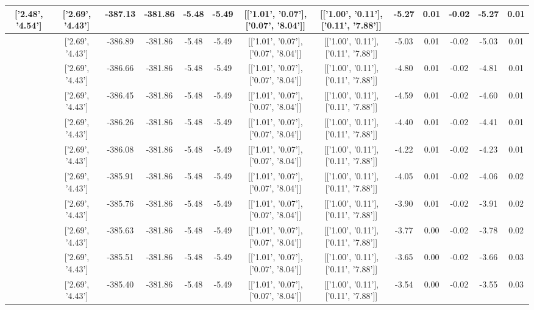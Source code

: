 \begin{table}[htbp]
\begin{adjustbox}{angle=90}
\begin{tabular}{|c|c|c|c|c|c|c|c|c|c|c|c|c|}
 ['2.48', '4.54'] & ['2.69', '4.43'] & -387.13 & -381.86 & -5.48 & -5.49 & [['1.01', '0.07'], ['0.07', '8.04']] & [['1.00', '0.11'], ['0.11', '7.88']] & -5.27 & 0.01 & -0.02 & -5.27 & 0.01\\ \hline
 ['2.49', '4.53'] & ['2.69', '4.43'] & -386.89 & -381.86 & -5.48 & -5.49 & [['1.01', '0.07'], ['0.07', '8.04']] & [['1.00', '0.11'], ['0.11', '7.88']] & -5.03 & 0.01 & -0.02 & -5.03 & 0.01\\ \hline
 ['2.50', '4.53'] & ['2.69', '4.43'] & -386.66 & -381.86 & -5.48 & -5.49 & [['1.01', '0.07'], ['0.07', '8.04']] & [['1.00', '0.11'], ['0.11', '7.88']] & -4.80 & 0.01 & -0.02 & -4.81 & 0.01\\ \hline
 ['2.52', '4.52'] & ['2.69', '4.43'] & -386.45 & -381.86 & -5.48 & -5.49 & [['1.01', '0.07'], ['0.07', '8.04']] & [['1.00', '0.11'], ['0.11', '7.88']] & -4.59 & 0.01 & -0.02 & -4.60 & 0.01\\ \hline
 ['2.53', '4.51'] & ['2.69', '4.43'] & -386.26 & -381.86 & -5.48 & -5.49 & [['1.01', '0.07'], ['0.07', '8.04']] & [['1.00', '0.11'], ['0.11', '7.88']] & -4.40 & 0.01 & -0.02 & -4.41 & 0.01\\ \hline
 ['2.54', '4.51'] & ['2.69', '4.43'] & -386.08 & -381.86 & -5.48 & -5.49 & [['1.01', '0.07'], ['0.07', '8.04']] & [['1.00', '0.11'], ['0.11', '7.88']] & -4.22 & 0.01 & -0.02 & -4.23 & 0.01\\ \hline
 ['2.56', '4.50'] & ['2.69', '4.43'] & -385.91 & -381.86 & -5.48 & -5.49 & [['1.01', '0.07'], ['0.07', '8.04']] & [['1.00', '0.11'], ['0.11', '7.88']] & -4.05 & 0.01 & -0.02 & -4.06 & 0.02\\ \hline
 ['2.57', '4.49'] & ['2.69', '4.43'] & -385.76 & -381.86 & -5.48 & -5.49 & [['1.01', '0.07'], ['0.07', '8.04']] & [['1.00', '0.11'], ['0.11', '7.88']] & -3.90 & 0.01 & -0.02 & -3.91 & 0.02\\ \hline
 ['2.58', '4.49'] & ['2.69', '4.43'] & -385.63 & -381.86 & -5.48 & -5.49 & [['1.01', '0.07'], ['0.07', '8.04']] & [['1.00', '0.11'], ['0.11', '7.88']] & -3.77 & 0.00 & -0.02 & -3.78 & 0.02\\ \hline
 ['2.59', '4.48'] & ['2.69', '4.43'] & -385.51 & -381.86 & -5.48 & -5.49 & [['1.01', '0.07'], ['0.07', '8.04']] & [['1.00', '0.11'], ['0.11', '7.88']] & -3.65 & 0.00 & -0.02 & -3.66 & 0.03\\ \hline
 ['2.61', '4.48'] & ['2.69', '4.43'] & -385.40 & -381.86 & -5.48 & -5.49 & [['1.01', '0.07'], ['0.07', '8.04']] & [['1.00', '0.11'], ['0.11', '7.88']] & -3.54 & 0.00 & -0.02 & -3.55 & 0.03\\ \hline

\end{tabular}
\end{adjustbox}
\end{table}
